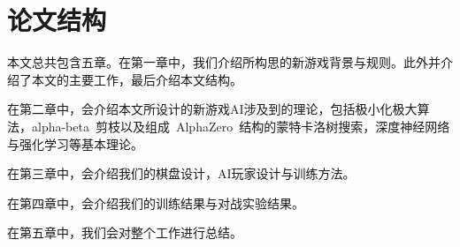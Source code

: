 \section{论文结构}
本文总共包含五章。在第一章中，我们介绍所构思的新游戏背景与规则。此外并介绍了本文的主要工作，最后介绍本文结构。

在第二章中，会介绍本文所设计的新游戏AI涉及到的理论，包括极小化极大算法，alpha-beta~剪枝以及组成~AlphaZero~结构的蒙特卡洛树搜索，深度神经网络与强化学习等基本理论。

在第三章中，会介绍我们的棋盘设计，AI玩家设计与训练方法。

在第四章中，会介绍我们的训练结果与对战实验结果。

在第五章中，我们会对整个工作进行总结。

